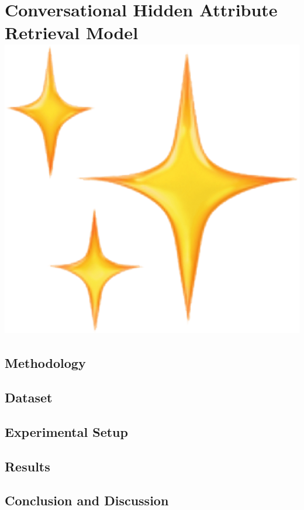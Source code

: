 \documentclass[11pt, oneside]{book}
\begin{document}
\chapter[CHARM]{Conversational Hidden Attribute Retrieval Model \includegraphics[scale=0.03]{stars.png}}









\section{Methodology}


\section{Dataset}


\section{Experimental Setup}


\section{Results}




\section{Conclusion and Discussion}




\end{document}
